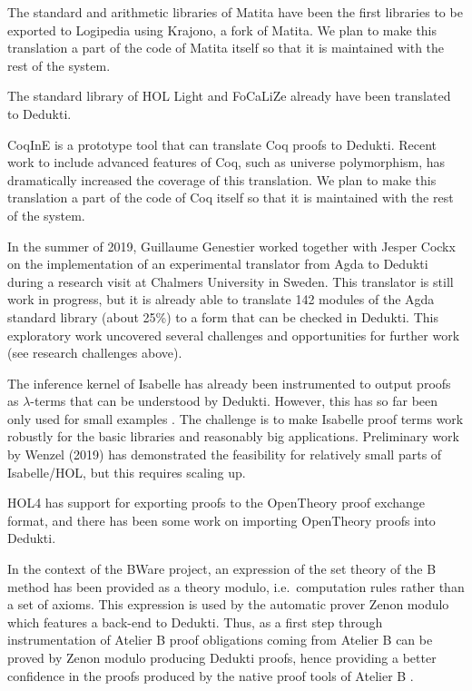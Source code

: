 \begin{compactitem}
\item The standard and arithmetic libraries of Matita have been the
  first libraries to be exported to Logipedia using Krajono, a fork of
  Matita. We plan to make this translation a part of the code of
  Matita itself so that it is maintained with the rest of the system.

\item The standard library of HOL Light and FoCaLiZe already have been
  translated to Dedukti.

\item CoqInE is a prototype tool that can translate Coq proofs to
  Dedukti. Recent work to include advanced features of Coq, such as
  universe polymorphism, has dramatically increased the coverage of
  this translation. We plan to make this translation a part of the
  code of Coq itself so that it is maintained with the rest of the
  system.

\item In the summer of 2019, Guillaume Genestier worked together with
  Jesper Cockx on the implementation of an experimental translator
  from Agda to Dedukti during a research visit at Chalmers University
  in Sweden. This translator is still work in progress, but it is
  already able to translate 142 modules of the Agda standard library
  (about 25\%) to a form that can be checked in Dedukti. This
  exploratory work uncovered several challenges and opportunities for
  further work (see research challenges above).

\item The inference kernel of Isabelle has already been instrumented
  to output proofs as $\lambda$-terms that can be understood by
  Dedukti. However, this has so far been only used for small examples
  \cite{Berghofer-Nipkow:2000:TPHOL}. The challenge is to make
  Isabelle proof terms work robustly for the basic libraries and
  reasonably big applications.  Preliminary work by Wenzel (2019) has
  demonstrated the feasibility for relatively small parts of
  Isabelle/HOL, but this requires scaling up.

\item HOL4 has support for exporting proofs to the OpenTheory proof
  exchange format, and there has been some work on importing
  OpenTheory proofs into Dedukti.

\item In the context of the BWare project, an expression of the set
  theory of the B method has been provided as a theory modulo, i.e.\ 
  computation rules rather than a set of axioms. This expression is used
  by the automatic prover Zenon modulo which features a back-end to
  Dedukti. Thus, as a first step through instrumentation of Atelier B
  proof obligations coming from Atelier B can be proved by Zenon
  modulo producing Dedukti proofs, hence providing a better confidence
  in the proofs produced by the native proof tools of Atelier B
  \cite{Bury18}.
\end{compactitem}


